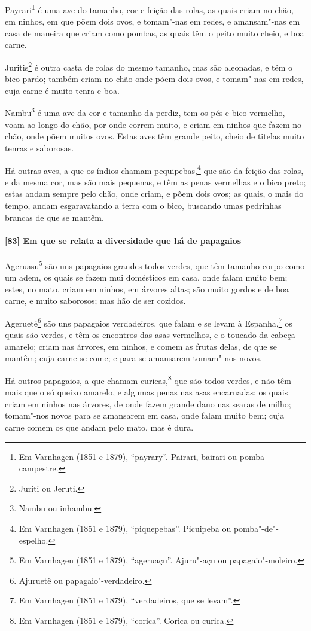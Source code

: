 \begin{linenumbers}
Payrari\footnote{ Em Varnhagen (1851 e 1879), ``payrary''. Pairari, bairari ou pomba
campestre.} é uma ave do tamanho, cor e feição das rolas, as quais criam no chão, em
ninhos, em que põem dois ovos, e tomam"-nas em redes, e amansam"-nas em casa de maneira que
criam como pombas, as quais têm o peito muito cheio, e boa carne.

Juritis\footnote{ Juriti ou Jeruti.} é outra casta de rolas do mesmo tamanho, mas são
aleonadas, e têm o bico pardo; também criam no chão onde põem dois ovos, e tomam"-nas em
redes, cuja carne é muito tenra e boa.

Nambu\footnote{ Nambu ou inhambu.} é uma ave da cor e tamanho da perdiz, tem os pés e bico
vermelho, voam ao longo do chão, por onde correm muito, e criam em ninhos que fazem no
chão, onde põem muitos ovos. Estas aves têm grande peito, cheio de titelas muito tenras e
saborosas.

Há outras aves, a que os índios chamam pequipebas,\footnote{ Em Varnhagen (1851 e 1879),
``piquepebas''. Picuipeba ou pomba"-de"-espelho.} que são da feição das rolas, e da mesma
cor, mas são mais pequenas, e têm as penas vermelhas e o bico preto; estas andam sempre
pelo chão, onde criam, e põem dois ovos; as quais, o mais do tempo, andam esgaravatando a
terra com o bico, buscando umas pedrinhas brancas de que se mantêm.

\paragraph{[83] Em que se relata a diversidade que há de papagaios}\quad
Ageruasu\footnote{ Em Varnhagen (1851 e 1879), ``ageruaçu''. Ajuru"-açu ou
papagaio"-moleiro.} são uns papagaios grandes todos verdes, que têm tamanho corpo como um
adem, os quais se fazem mui domésticos em casa, onde falam muito bem; estes, no mato,
criam em ninhos, em árvores altas; são muito gordos e de boa carne, e muito saborosos; mas
hão de ser cozidos.

Agerueté\footnote{ Ajuruetê ou papagaio"-verdadeiro.} são uns papagaios verdadeiros, que
falam e se levam à Espanha,\footnote{ Em Varnhagen (1851 e 1879), ``verdadeiros, que se
levam''.} os quais são verdes, e têm os encontros das asas vermelhos, e o toucado da
cabeça amarelo; criam nas árvores, em ninhos, e comem as frutas delas, de que se mantêm;
cuja carne se come; e para se amansarem tomam"-nos novos.

Há outros papagaios, a que chamam curicas,\footnote{ Em Varnhagen (1851 e 1879),
``corica''. Corica ou curica.} que são todos verdes, e não têm mais que o só queixo
amarelo, e algumas penas nas asas encarnadas; os quais criam em ninhos nas árvores, de
onde fazem grande dano nas searas de milho; tomam"-nos novos para se amansarem em casa,
onde falam muito bem; cuja carne comem os que andam pelo mato, mas é dura.


\end{linenumbers}
